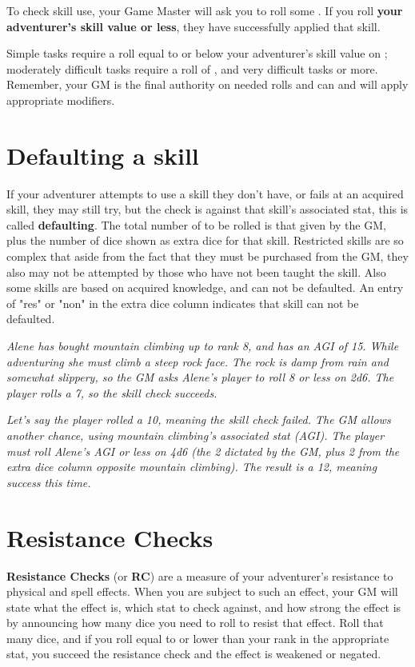 \begin{multicols*}{2}
To check skill use, your Game Master will ask you to roll some . If you roll \textbf{your adventurer's skill value or less}, they have successfully applied that skill.

Simple tasks require a roll equal to or below your adventurer's skill value on ; moderately difficult tasks require a roll of , and very difficult tasks  or more. Remember, your GM is the final authority on needed rolls and can and will apply appropriate modifiers.
\section{Defaulting a skill}
If your adventurer attempts to use a skill they don't have, or fails at an acquired skill, they may still try, but the check is against that skill's associated stat, this is called \textbf{defaulting}. The total number of  to be rolled is that given by the GM, plus the number of dice shown as extra dice for that skill. Restricted skills are so complex that aside from the fact that they must be purchased from the GM, they also may not be attempted by those who have not been taught the skill. Also some skills are based on acquired knowledge, and can not be defaulted. An entry of "res" or "non" in the extra dice column indicates that skill can not be defaulted.

\textit{Alene has bought mountain climbing up to rank 8, and has an AGI of 15. While adventuring she must climb a steep rock face. The rock is damp from rain and somewhat
slippery, so the GM asks Alene's player to roll 8 or less on 2d6. The player rolls a 7, so the skill check succeeds.}

\textit{Let's say the player rolled a 10, meaning the skill check failed. The GM allows another chance, using mountain climbing's associated stat (AGI). The player must roll Alene's AGI or less on 4d6 (the 2 dictated by the GM, plus 2 from the extra dice column opposite mountain climbing). The result is a 12, meaning success this time.}
\section{Resistance Checks}
\textbf{Resistance Checks} (or \textbf{RC}) are a measure of your adventurer's resistance to physical and spell effects. When you are subject to such an effect, your GM will state what the effect is, which stat to check against, and how strong the effect is by announcing how many dice you need to roll to resist that effect. Roll that many dice, and if you roll equal to or lower than your rank in the appropriate stat, you succeed the resistance check and the effect is weakened or negated.

\end{multicols*}
